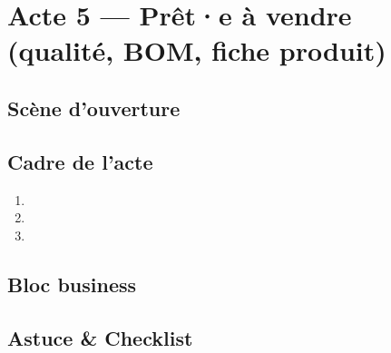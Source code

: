 \documentclass[../../main.tex]{subfiles}
\begin{document}
\chapter{Acte 5 — Prêt·e à vendre (qualité, BOM, fiche produit)}

\begin{Hook}
\end{Hook}

\section*{Scène d'ouverture}

\section{Cadre de l'acte}
\begin{BlocObjectif}
\end{BlocObjectif}

\spacer

\begin{BlocMateriel}
\end{BlocMateriel}

\spacer

\begin{BlocEtapes}
\begin{enumerate}
  \item 
  \item 
  \item 
\end{enumerate}
\end{BlocEtapes}

\spacer

\begin{BlocControles}
\end{BlocControles}

\spacer

\begin{BlocDepannage}
\end{BlocDepannage}

\section{Bloc business}
\begin{BlocCouts}
\end{BlocCouts}

\spacer

\begin{BlocAVendre}
\end{BlocAVendre}

\section*{Astuce \& Checklist}
\begin{BlocAstuce}
\end{BlocAstuce}

\spacer

\begin{BlocChecklist}
\end{BlocChecklist}
\end{document}

